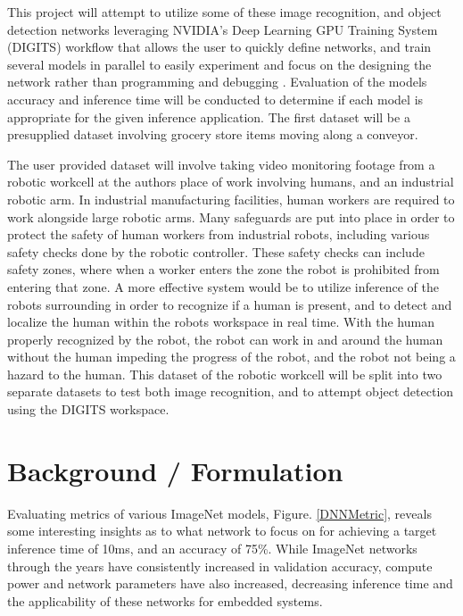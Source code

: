 \documentclass[10pt,journal,compsoc]{IEEEtran}
\begin{document}
This project will attempt to utilize some of these image recognition, and object detection networks leveraging NVIDIA's Deep Learning GPU Training System (DIGITS) workflow that allows the user to quickly define networks, and train several models in parallel to easily experiment and focus on the designing the network rather than programming and debugging \cite{NvidiaDN}. Evaluation of the models accuracy and inference time will be conducted to determine if each model is appropriate for the given inference application. The first dataset will be a presupplied dataset involving grocery store items moving along a conveyor.

The user provided dataset will involve taking video monitoring footage from a robotic workcell at the authors place of work involving humans, and an industrial robotic arm. In industrial manufacturing facilities, human workers are required to work alongside large robotic arms. Many safeguards are put into place in order to protect the safety of human workers from industrial robots, including various safety checks done by the robotic controller. These safety checks can include safety zones, where when a worker enters the zone the robot is prohibited from entering that zone. A more effective system would be to utilize inference of the robots surrounding in order to recognize if a human is present, and to detect and localize the human within the robots workspace in real time. With the human properly recognized by the robot, the robot can work in and around the human without the human impeding the progress of the robot, and the robot not being a hazard to the human. This dataset of the robotic workcell will be split into two separate datasets to test both image recognition, and to attempt object detection using the DIGITS workspace.

\section{Background / Formulation}
\label{sec:background}

Evaluating metrics of various ImageNet models, Figure. \ref{DNNMetric}, reveals some interesting insights as to what network to focus on for achieving a target inference time of 10ms, and an accuracy of 75\%. While ImageNet networks through the years have consistently increased in validation accuracy, compute power and network parameters have also increased, decreasing inference time and the applicability of these networks for embedded systems.
\end{document}
